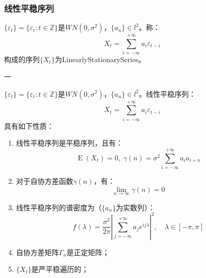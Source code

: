 \subsubsection{线性平稳序列}
\begin{definition}
	$\{\varepsilon_t\}=\{\varepsilon_t:t\in\mathbb{Z}\}$是$WN(0,\sigma^2)$，$\{a_n\}\in l^2$。称：
	\begin{equation*}
		X_t=\sum_{i=-\infty}^{+\infty}a_i\varepsilon_{t-i}
	\end{equation*}
	构成的序列$\{X_t\}$为\gls{LinearlyStationarySeries}。
\end{definition}
一
\begin{property}\label{prop:LinearlyStationarySeries}
	$\{\varepsilon_t\}=\{\varepsilon_t:t\in\mathbb{Z}\}$是$WN(0,\sigma^2)$，$\{a_n\}\in l^2$。线性平稳序列：
	\begin{equation*}
		X_t=\sum_{i=-\infty}^{+\infty}a_i\varepsilon_{t-i}
	\end{equation*}
	具有如下性质：
	\begin{enumerate}
		\item 线性平稳序列是平稳序列，且有：
		\begin{equation*}
			\operatorname{E}(X_t)=0,\;\gamma(n)=\sigma^2\sum_{i=-\infty}^{+\infty}a_ia_{i+n}
		\end{equation*}
		\item 对于自协方差函数$\gamma(n)$，有：
		\begin{equation*}
			\lim_{n\to\infty}\gamma(n)=0
		\end{equation*}\par
		\item 线性平稳序列的谱密度为（$\{a_n\}$为实数列）：
		\begin{equation*}
			f(\lambda)=\frac{\sigma^2}{2\pi}\left|\sum_{j=-\infty}^{+\infty}a_je^{ij\lambda}\right|^2,\quad\lambda\in[-\pi,\pi]
		\end{equation*}
		\item 自协方差矩阵$\Gamma_n$是正定矩阵；
		\item $\{X_t\}$是严平稳遍历的；
	\end{enumerate}
\end{property}
